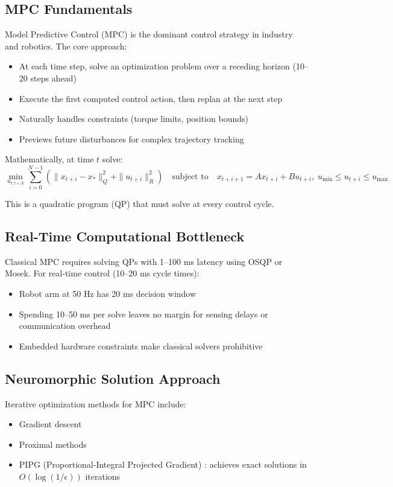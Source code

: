 \subsection{MPC Fundamentals}

Model Predictive Control (MPC) \cite{Rawlings2020} is the dominant control strategy in industry and robotics. The core approach:
\begin{itemize}
\item At each time step, solve an optimization problem over a receding horizon (10--20 steps ahead)
\item Execute the first computed control action, then replan at the next step
\item Naturally handles constraints (torque limits, position bounds)
\item Previews future disturbances for complex trajectory tracking
\end{itemize}

Mathematically, at time $t$ solve:
\[
\min_{u_{t:t+N}} \sum_{i=0}^{N-1} \left( \|x_{t+i} - x_*\|_Q^2 + \|u_{t+i}\|_R^2 \right) \quad \text{subject to} \quad x_{t+i+1} = Ax_{t+i} + Bu_{t+i}, \; u_{\min} \le u_{t+i} \le u_{\max}
\]

This is a quadratic program (QP) that must solve at every control cycle.

\subsection{Real-Time Computational Bottleneck}

Classical MPC requires solving QPs with 1--100 ms latency using OSQP \cite{Stellato2018} or Mosek. For real-time control (10--20 ms cycle times):
\begin{itemize}
\item Robot arm at 50 Hz has 20 ms decision window
\item Spending 10--50 ms per solve leaves no margin for sensing delays or communication overhead
\item Embedded hardware constraints make classical solvers prohibitive
\end{itemize}

\subsection{Neuromorphic Solution Approach}

Iterative optimization methods for MPC include:
\begin{itemize}
\item Gradient descent \cite{Nesterov2018}
\item Proximal methods \cite{Boyd2010}
\item PIPG (Proportional-Integral Projected Gradient) \cite{He2016}: achieves exact solutions in $O(\log(1/\epsilon))$ iterations
\end{itemize}

